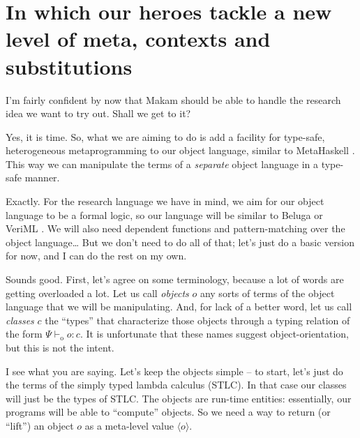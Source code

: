 \section{In which our heroes tackle a new level of meta, contexts and
substitutions}\label{in-which-our-heroes-tackle-a-new-level-of-meta-contexts-and-substitutions}

\heroSTUDENT{} I'm fairly confident by now that Makam should be able to handle
the research idea we want to try out. Shall we get to it?

\heroADVISOR{} Yes, it is time. So, what we are aiming to do is add a facility
for type-safe, heterogeneous metaprogramming to our object language,
similar to MetaHaskell \citep{mainland2012explicitly}. This way we can
manipulate the terms of a \emph{separate} object language in a type-safe
manner.

\heroSTUDENT{} Exactly. For the research language we have in mind, we aim for
our object language to be a formal logic, so our language will be
similar to Beluga \citep{beluga-main-reference} or VeriML
\citep{veriml-main-reference}. We will also need dependent functions and
pattern-matching over the object language\ldots{} But we don't need to
do all of that; let's just do a basic version for now, and I can do the
rest on my own.

\newcommand\dep[1]{\ensuremath{#1}}
\newcommand\lift[1]{\ensuremath{\langle#1\rangle}}
\newcommand\odash[0]{\ensuremath{\vdash_{\text{o}}}}
\newcommand\wf[0]{\ensuremath{\; \text{wf}}}
\newcommand\aq[1]{\ensuremath{\texttt{aq}(#1)}}
\newcommand\aqopen[1]{\ensuremath{\texttt{aqopen}(#1)}}

\heroADVISOR{} Sounds good. First, let's agree on some terminology, because a
lot of words are getting overloaded a lot. Let us call \emph{objects}
\(o\) any sorts of terms of the object language that we will be
manipulating. And, for lack of a better word, let us call \emph{classes}
\(c\) the ``types'' that characterize those objects through a typing
relation of the form \(\Psi \odash o : c\). It is unfortunate that these
names suggest object-orientation, but this is not the intent.

\heroSTUDENT{} I see what you are saying. Let's keep the objects simple -- to
start, let's just do the terms of the simply typed lambda calculus
(STLC). In that case our classes will just be the types of STLC. The
objects are run-time entities: essentially, our programs will be able to
``compute'' objects. So we need a way to return (or ``lift'') an object
\(o\) as a meta-level value \(\lift{o}\).

